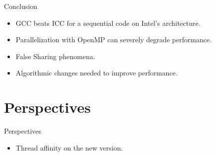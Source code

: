 \documentclass{beamer}
\begin{document}
\begin{frame}{Conclusion}
\begin{itemize}
	\item
	GCC beats ICC for a sequential code on Intel's architecture.
	\item
	Parallelization with OpenMP can severely degrade performance.
  \item
    False Sharing phenomena.
  \item
  	Algorithmic changes needed to improve performance.
 \end{itemize}	
\end{frame}

\section{Perspectives}

\begin{frame}{Perspectives}
\begin{itemize}
	\item
	Thread affinity on the new version.
 \end{itemize}	
\end{frame}
\end{document}
